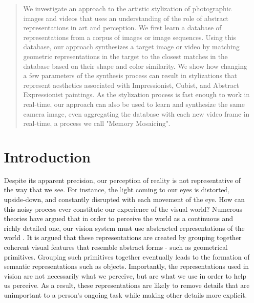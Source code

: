 \documentclass[a4paper,10pt,final]{ThesisStyle}
\begin{document}
\begin{abstract}
We investigate an approach to the artistic stylization of photographic images and videos that uses an understanding of the role of abstract representations in art and perception.  We first learn a database of representations from a corpus of images or image sequences.  Using this database, our approach synthesizes a target image or video by matching geometric representations in the target to the closest matches in the database based on their shape and color similarity.  We show how changing a few parameters of the synthesis process can result in stylizations that represent aesthetics associated with Impressionist, Cubist, and Abstract Expressionist paintings.  As the stylization process is fast enough to work in real-time, our approach can also be used to learn and synthesize the same camera image, even aggregating the database with each new video frame in real-time, a process we call "Memory Mosaicing". 

\end{abstract}

\section{Introduction}  
Despite its apparent precision, our perception of reality is not representative of the way that we see.  For instance, the light coming to our eyes is distorted, upside-down, and constantly disrupted with each movement of the eye.  How can this noisy process ever constitute our experience of the visual world?  Numerous theories have argued that in order to perceive the world as a continuous and richly detailed one, our vision system must use abstracted representations of the world \cite{Marr1982}.  It is argued that these representations are created by grouping together coherent visual features that resemble abstract forms - such as geometrical primitives. Grouping such primitives together eventually leads to the formation of semantic representations such as objects. Importantly, the representations used in vision are not necessarily what we perceive, but are what we use in order to help us perceive. As a result, these representations are likely to remove details that are unimportant to a person's ongoing task while making other details more explicit.
\end{document}
